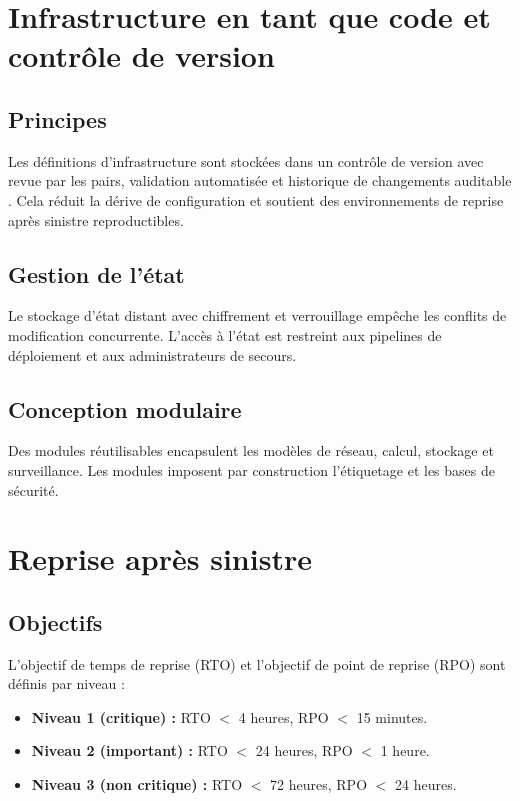 
\section{Infrastructure en tant que code et contrôle de version}

\subsection{Principes}

Les définitions d'infrastructure sont stockées dans un contrôle de version avec revue par les pairs, validation automatisée et historique de changements auditable \parencite{hashicorpTerraform}. Cela réduit la dérive de configuration et soutient des environnements de reprise après sinistre reproductibles.

\subsection{Gestion de l'état}

Le stockage d'état distant avec chiffrement et verrouillage empêche les conflits de modification concurrente. L'accès à l'état est restreint aux pipelines de déploiement et aux administrateurs de secours.

\subsection{Conception modulaire}

Des modules réutilisables encapsulent les modèles de réseau, calcul, stockage et surveillance. Les modules imposent par construction l'étiquetage et les bases de sécurité.

\section{Reprise après sinistre}

\subsection{Objectifs}

L'objectif de temps de reprise (RTO) et l'objectif de point de reprise (RPO) sont définis par niveau :
\begin{itemize}
  \item \textbf{Niveau 1 (critique) :} RTO $<$ 4 heures, RPO $<$ 15 minutes.
  \item \textbf{Niveau 2 (important) :} RTO $<$ 24 heures, RPO $<$ 1 heure.
  \item \textbf{Niveau 3 (non critique) :} RTO $<$ 72 heures, RPO $<$ 24 heures.
\end{itemize}

